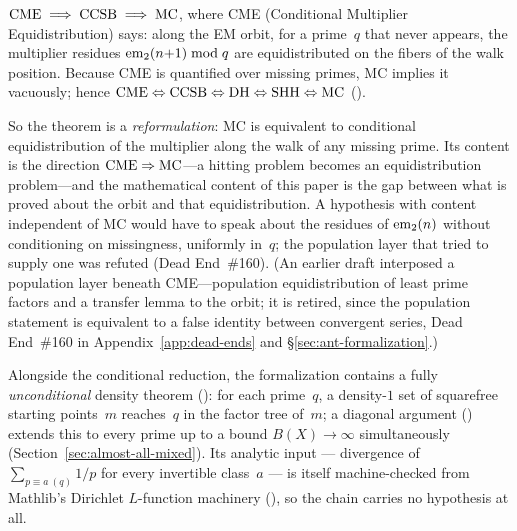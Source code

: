 \begin{theorem}
\label{thm:main-chain}
$\mathrm{CME} \;\Longrightarrow\;
 \mathrm{CCSB} \;\Longrightarrow\; \mathrm{MC}$,
where CME (Conditional Multiplier Equidistribution) says: along the EM
orbit, for a prime~$q$ that never appears, the multiplier residues
$\mathrm{em}_{2}(n{+}1) \bmod q$ are equidistributed on the fibers of the walk
position.  Because CME is quantified over missing primes, MC implies it
vacuously; hence $\mathrm{CME} \Leftrightarrow \mathrm{CCSB}
\Leftrightarrow \mathrm{DH} \Leftrightarrow \mathrm{SHH} \Leftrightarrow
\mathrm{MC}$ ().
\end{theorem}

\noindent So the theorem is a \emph{reformulation}: MC is equivalent to
conditional equidistribution of the multiplier along the walk of any
missing prime.  Its content is the direction $\mathrm{CME} \Rightarrow
\mathrm{MC}$---a hitting problem becomes an equidistribution problem---and the
mathematical content of this paper is the gap between what is proved
about the orbit and that equidistribution\@.  A hypothesis with content
independent of MC would have to speak about the residues of $\mathrm{em}_{2}(n)$
without conditioning on missingness, uniformly in~$q$; the population
layer that tried to supply one was refuted (Dead End~\#160).  (An earlier draft interposed a
population layer beneath CME---population equidistribution of least
prime factors and a transfer lemma to the orbit; it is retired, since
the population statement is equivalent to a false identity between
convergent series, Dead End~\#160 in Appendix~\ref{app:dead-ends} and
\S\ref{sec:ant-formalization}.)

Alongside the conditional reduction, the formalization contains a
fully \emph{unconditional} density theorem
():
for each prime~$q$, a density-$1$ set of squarefree starting
points~$m$ reaches~$q$ in the factor tree of~$m$; a diagonal argument
()
extends this to every prime up to a bound $B(X) \to \infty$
simultaneously (Section~\ref{sec:almost-all-mixed}).  Its analytic input ---
divergence of $\sum_{p \equiv a \ (q)} 1/p$ for every invertible
class~$a$ --- is itself machine-checked from Mathlib's Dirichlet
$L$-function machinery
(),
so the chain carries no hypothesis at all.

